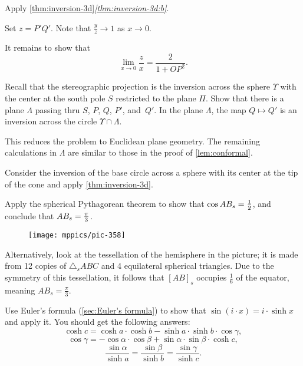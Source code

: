 Apply \ref{thm:inversion-3d}\textit{\ref{thm:inversion-3d:b}}.

Set $z=P'Q'$.
Note that $\tfrac yz\to 1$ as $x\to 0$.

It remains to show that 
$$\lim_{x\to 0} \frac{z}{x}=\frac{2}{1+OP^2}.$$

Recall that the stereographic projection is the inversion across the sphere $\Upsilon$ with the center at the south pole $S$ restricted to the plane $\Pi$.
Show that there is a plane $\Lambda$ passing thru $S$, $P$, $Q$, $P'$, and~$Q'$.
In the plane $\Lambda$, the map $Q\mapsto Q'$ is an inversion across the circle $\Upsilon\cap \Lambda$.

This reduces the problem to Euclidean plane geometry.
The remaining calculations in $\Lambda$ are similar to those in the proof of \ref{lem:conformal}.

Consider the inversion of the base circle across a sphere with its center at the tip of the cone and apply \ref{thm:inversion-3d}.

{

Apply the spherical Pythagorean theorem to show that
$
\cos AB_s=\tfrac12
$,
and conclude that $AB_s=\tfrac\pi3$.

\begin{wrapfigure}{r}{28mm}
\vskip-5mm
\centering
\texttt{[image: mppics/pic-358]}
\end{wrapfigure}

Alternatively, 
look at the tessellation of the hemisphere in the picture; 
it is made from 12 copies of $\triangle_s A B C$ and 4 equilateral spherical triangles.
Due to the symmetry of this tessellation, it follows that $[AB]_s$ occupies $\tfrac16$ of the equator, meaning $AB_s=\tfrac\pi3$.

}

Use Euler's formula (\ref{sec:Euler's formula}) to show that $\sin(i\cdot x)=i\cdot\sinh x$ and apply it.
You should get the following answers:
\[\cosh c=\cosh a \cdot \cosh b-\sinh a\cdot \sinh b\cdot \cos\gamma,\]
\[\cos \gamma=-\cos \alpha \cdot \cos \beta+\sin \alpha\cdot \sin \beta \cdot \cosh c,\]
\[\frac{\sin \alpha}{\sinh a}=\frac{\sin \beta}{\sinh b}=\frac{\sin \gamma}{\sinh c}.\]




\setcounter{eqtn}{0}

